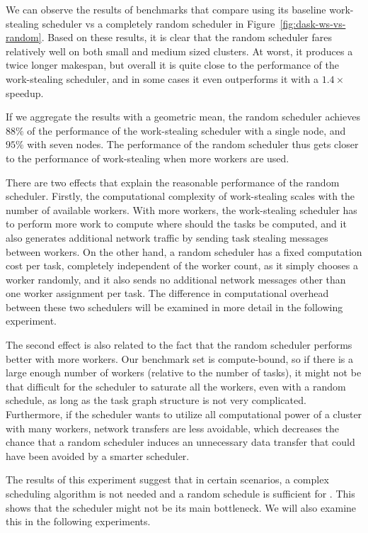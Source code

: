 We can observe the results of benchmarks that compare \dask{} using its baseline
work-stealing scheduler vs a completely random scheduler in Figure~\ref{fig:dask-ws-vs-random}. Based
on these results, it is clear that the random scheduler fares relatively well on both small and
medium sized clusters. At worst, it produces a twice longer makespan, but overall it is quite close
to the performance of the work-stealing scheduler, and in some cases it even outperforms it with a
$1.4\times$ speedup.

If we aggregate the results with a geometric mean, the random scheduler achieves
$88\%$ of the performance of the work-stealing scheduler with a single node, and
$95\%$ with seven nodes. The performance of the random scheduler thus gets closer
to the performance of work-stealing when more workers are used.

There are two effects that explain the reasonable performance of the random scheduler. Firstly, the
computational complexity of work-stealing scales with the number of available workers. With more
workers, the work-stealing scheduler has to perform more work to compute where should the tasks be
computed, and it also generates additional network traffic by sending task stealing messages
between workers. On the other hand, a random scheduler has a fixed computation cost per task,
completely independent of the worker count, as it simply chooses a worker randomly, and it also
sends no additional network messages other than one worker assignment per task. The difference in
computational overhead between these two schedulers will be examined in more detail in the
following experiment.

The second effect is also related to the fact that the random scheduler performs better with more
workers. Our benchmark set is compute-bound, so if there is a large enough number of workers
(relative to the number of tasks), it might not be that difficult for the scheduler to saturate all
the workers, even with a random schedule, as long as the task graph structure is not very
complicated. Furthermore, if the scheduler wants to utilize all computational power of a cluster
with many workers, network transfers are less avoidable, which decreases the chance that a random
scheduler induces an unnecessary data transfer that could have been avoided by a smarter scheduler.

The results of this experiment suggest that in certain scenarios, a complex scheduling algorithm is
not needed and a random schedule is sufficient for \dask{}. This shows that the
scheduler might not be its main bottleneck. We will also examine this in the following experiments.


